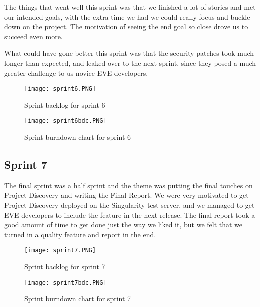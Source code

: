 The things that went well this sprint was that we finished a lot of stories and met our intended goals, with the extra time we had we could really focus and buckle down on the project. The motivation of seeing the end goal so close drove us to succeed even more.

What could have gone better this sprint was that the security patches took much longer than expected, and leaked over to the next sprint, since they posed a much greater challenge to us novice EVE developers.

\begin{landscape}

\begin{figure}[H]
	\centering
	\graphicspath{ {./graphics/} }
    \centerline{\texttt{[image: sprint6.PNG]}}
    \caption{\label{fig:s6}Sprint backlog for sprint 6}
\end{figure}

\end{landscape}

\begin{figure}[H]
	\centering
	\graphicspath{ {./graphics/} }
    \centerline{\texttt{[image: sprint6bdc.PNG]}}
    \caption{\label{fig:s6bd}Sprint burndown chart for sprint 6}
\end{figure}

\subsection{Sprint 7}
The final sprint was a half sprint and the theme was putting the final touches on Project Discovery and writing the Final Report. We were very motivated to get Project Discovery deployed on the Singularity test server, and we managed to get EVE developers to include the feature in the next release. The final report took a good amount of time to get done just the way we liked it, but we felt that we turned in a quality feature and report in the end.

\begin{landscape}

\begin{figure}[H]
	\centering
	\graphicspath{ {./graphics/} }
    \centerline{\texttt{[image: sprint7.PNG]}}
    \caption{\label{fig:s7}Sprint backlog for sprint 7}
\end{figure}

\end{landscape}

\begin{figure}[H]
	\centering
	\graphicspath{ {./graphics/} }
    \centerline{\texttt{[image: sprint7bdc.PNG]}}
    \caption{\label{fig:s7bd}Sprint burndown chart for sprint 7}
\end{figure}
 